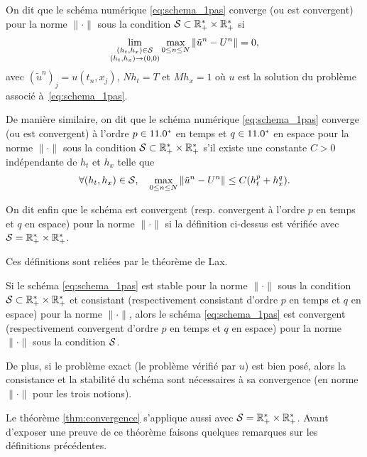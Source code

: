 \documentclass[12pt,a4paper,twoside]{article}
\begin{document}
\begin{definition}[Convergence]
  \label{def:convergence}
  On dit que le sch\'ema num\'erique \eqref{eq:schema_1pas} converge (ou est convergent)
  pour la norme $\| \cdot \|$
  sous la condition $\mathcal{S} \subset \mathbb{R}_+^* \times \mathbb{R}_+^*$
  si 
  \begin{align}
    \lim_{\substack{(h_t,h_x) \in \mathcal{S} \\ (h_t,h_x) \to (0,0)}} \max_{0\leq n \leq N} 
    \| \tilde{u}^n - U^n \| = 0 ,
  \end{align}
  avec $(\tilde{u}^n)_j = u(t_n,x_j)$,
  $Nh_t = T$ et $Mh_x = 1$ o\`u $u$ est la solution du probl\`eme associ\'e \`a~\eqref{eq:schema_1pas}.
  
  De mani\`ere similaire, on dit que le sch\'ema num\'erique 
  \eqref{eq:schema_1pas} converge (ou est convergent) 
  \`a l'ordre $p\in11.0^*$ en temps et $q\in11.0^*$ en espace pour la norme $\| \cdot \|$
  sous la condition $\mathcal{S} \subset \mathbb{R}_+^* \times \mathbb{R}_+^*$
  s'il existe une constante $C>0$ ind\'ependante de $h_t$ et $h_x$
  telle que
  \begin{align}
    \forall (h_t , h_x) \in \mathcal{S} , \quad \max_{0\leq n \leq N}
    \| \tilde{u}^n - U^n \| \leq C (h_t^p + h_x^q) .
  \end{align}

  On dit enfin que le sch\'ema est convergent (resp. convergent \`a l'ordre $p$
  en temps et $q$ en espace) pour la norme $\| \cdot \|$ si la d\'efinition ci-dessus est v\'erifi\'ee
  avec $\mathcal{S} = \mathbb{R}_+^* \times \mathbb{R}_+^*$.
\end{definition}

Ces d\'efinitions sont reli\'ees par le th\'eor\`eme de Lax.
\begin{theorem}
  \label{thm:convergence}
  Si le sch\'ema \eqref{eq:schema_1pas} est stable pour la norme $\| \cdot \|$
  sous la condition $\mathcal{S} \subset \mathbb{R}_+^* \times \mathbb{R}_+^*$ et consistant 
  (respectivement consistant d'ordre $p$ en temps et $q$ en espace)
  pour la norme $\| \cdot \|$,
  alors le sch\'ema \eqref{eq:schema_1pas} est convergent
  (respectivement convergent d'ordre $p$ en temps et $q$ en espace)
  pour la norme $\| \cdot \|$ sous la condition $\mathcal{S}$.


  De plus, si le probl\`eme exact (le probl\`eme v\'erifi\'e par $u$) 
  est bien pos\'e, alors la consistance et la stabilit\'e du sch\'ema 
  sont n\'ecessaires \`a sa convergence (en norme $\| \cdot \|$ pour les trois notions).
\end{theorem}
Le th\'eor\`eme \ref{thm:convergence} s'applique aussi avec $\mathcal{S} = \mathbb{R}_+^* \times \mathbb{R}_+^*$.
Avant d'exposer une preuve de ce th\'eor\`eme 
faisons quelques remarques sur les d\'efinitions pr\'ec\'edentes.
\end{document}
